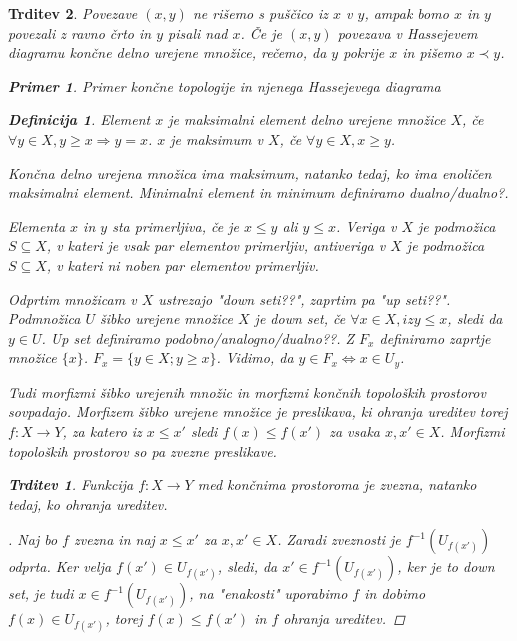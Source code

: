 \documentclass[a4paper,12pt]{article}
\theoremstyle{definition}
\newtheorem{definicija}{Definicija}
\theoremstyle{plain}
\theoremstyle{definition}
\newtheorem{primer}{Primer}
\theoremstyle{plain}
\newtheorem{trditev}{Trditev}
\theoremstyle{plain}
\theoremstyle{plain}
\theoremstyle{plain}
\newenvironment{dokaz}{\begin{proof}[\bfseries\upshape\proofname]}{\end{proof}}
\begin{document}
\begin{trditev}
Povezave $(x,y)$ ne rišemo s puščico iz $x$ v $y$, ampak bomo $x$ in $y$ povezali z ravno črto in $y$ pisali nad $x$. Če je $(x,y)$ povezava v Hassejevem diagramu končne delno urejene množice, rečemo, da $y$ \textit{pokrije} $x$ in pišemo $x\prec y$.

\begin{primer}
    Primer končne topologije in njenega Hassejevega diagrama
\end{primer}

\begin{definicija}
    Element $x$ je \textit{maksimalni element} delno urejene množice $X$, če $\forall y \in X, y\geq x \Rightarrow y = x$.
    $x$ je \textit{maksimum} v $X$, če $\forall y \in X, x\geq y$.
\end{definicija}

Končna delno urejena množica ima maksimum, natanko tedaj, ko ima enoličen maksimalni element. \textit{Minimalni element} in \textit{minimum} definiramo dualno/dualno?.

Elementa $x$ in $y$ sta \textit{primerljiva}, če je $x\leq y$ ali $y\leq x$. \textit{Veriga} v $X$ je podmožica $S\subseteq X$, v kateri je vsak par elementov primerljiv, \textit{antiveriga} v $X$ je podmožica $S\subseteq X$, v kateri ni noben par elementov primerljiv. 

Odprtim množicam v $X$ ustrezajo \textit{"down seti??"}, zaprtim pa \textit{"up seti??"}. Podmnožica $U$
 šibko urejene množice $X$ je down set, če $\forall x\in X, iz y\leq x$, sledi da $y\in U$. Up set definiramo podobno/analogno/dualno??.
Z $F_x$ definiramo zaprtje množice $\{x\}$. $F_x=\{y\in X; y\geq x\}$. Vidimo, da $y\in F_x \Leftrightarrow x\in U_y$.

Tudi morfizmi šibko urejenih množic in morfizmi končnih topoloških prostorov sovpadajo.
  Morfizem šibko urejene množice je preslikava, ki ohranja ureditev torej $f: X\rightarrow Y$, 
  za katero iz $x\leq x'$ sledi $f(x)\leq f(x')$ za vsaka $x,x'\in X$. Morfizmi topoloških prostorov so pa zvezne preslikave.

\begin{trditev}
Funkcija $f:X\rightarrow Y$ med končnima prostoroma je zvezna, natanko tedaj, ko ohranja ureditev.
\end{trditev}

\begin{dokaz}
    Naj bo $f$ zvezna in naj $x\leq x'$ za $x, x' \in X$. Zaradi zveznosti je $f^{-1}(U_{f(x')})$ odprta. Ker velja $f(x')\in U_{f(x')}$, sledi, da $x'\in f^{-1}(U_{f(x')})$, ker je to down set, je tudi $x\in f^{-1}(U_{f(x')})$, na "enakosti" uporabimo $f$ in dobimo $f(x)\in U_{f(x')}$, torej $f(x)\leq f(x')$ in $f$ ohranja ureditev.


\end{dokaz}
\end{trditev}
\end{document}
